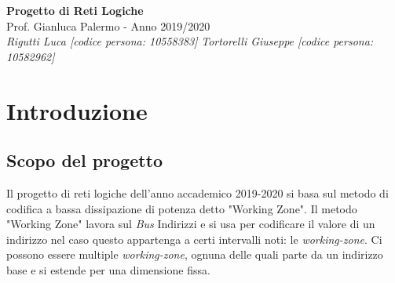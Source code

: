 \documentclass{article}
\begin{document}
\begin{titlepage}
   \begin{center}
      \Huge\textbf{Progetto di Reti Logiche}\\
      \vspace{5mm} %
      \Large Prof. Gianluca Palermo - Anno 2019/2020\\
      \vspace{5mm} %
      \large\textit{Rigutti Luca [codice persona: 10558383]}
      \linebreak
      \large\textit{Tortorelli Giuseppe [codice persona: 10582962]}
   \end{center}
\end{titlepage}
\printindex

\tableofcontents
\pagebreak

\section{Introduzione}
\subsection{Scopo del progetto}
Il progetto di reti logiche dell'anno accademico 2019-2020 si basa sul metodo di codifica a bassa dissipazione di potenza detto "Working Zone".
Il metodo "Working Zone" lavora sul \textit{Bus} Indirizzi e si usa per codificare il valore di un indirizzo nel caso questo appartenga a certi intervalli noti: le \textit{working-zone}. Ci possono essere multiple \textit{working-zone}, ognuna delle quali parte da un indirizzo base e si estende per una dimensione fissa.
\end{document}
